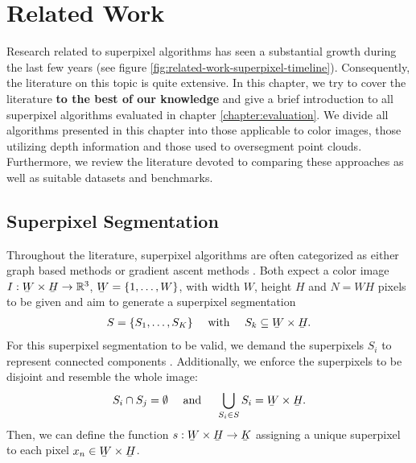 \chapter{Related Work}
\label{chapter:related-work}

Research related to superpixel algorithms has seen a substantial growth during the last few years (see figure \ref{fig:related-work-superpixel-timeline}). Consequently, the literature on this topic is quite extensive. In this chapter, we try to cover the literature \textbf{to the best of our knowledge} and give a brief introduction to all superpixel algorithms evaluated in chapter \ref{chapter:evaluation}. We divide all algorithms presented in this chapter into those applicable to color images, those utilizing depth information and those used to oversegment point clouds. Furthermore, we review the literature devoted to comparing these approaches as well as suitable datasets and benchmarks.

\section{Superpixel Segmentation}
\label{section:related-work-superpixel-segmentation}

Throughout the literature, superpixel algorithms are often categorized as either graph based methods or gradient ascent methods \cite{AchantaShajiSmithLucchiFuaSuesstrunk:2012}. Both expect a color image $I : \ubar{W} \times \ubar{H} \rightarrow \mathbb{R}^3$, $\ubar{W} = \{1, \ldots, W\}$, with width $W$, height $H$ and $N = WH$ pixels to be given and aim to generate a superpixel segmentation
\begin{align}
	S = \{S_1,\ldots,S_K\}\quad \text{ with }\quad S_k \subseteq \ubar{W} \times \ubar{H}.
\end{align}
For this superpixel segmentation to be valid, we demand the superpixels $S_i$ to represent connected components \cite{LevinshteinStereKutulakosFleetDickinsonSiddiqi:2009}. Additionally, we enforce the superpixels to be disjoint and resemble the whole image:
\begin{align}
	S_i \cap S_j = \emptyset\quad \text{ and }\quad \bigcup_{S_i \in S} S_i = \ubar{W} \times \ubar{H}.
\end{align}
Then, we can define the function $s: \ubar{W} \times \ubar{H} \rightarrow \ubar{K}$ assigning a unique superpixel to each pixel $x_n \in \ubar{W} \times \ubar{H}$.


